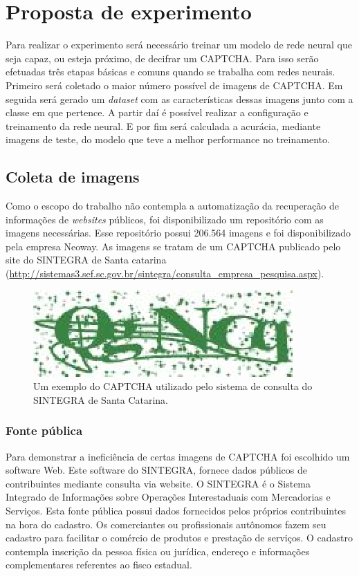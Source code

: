 \chapter{Proposta de experimento} \label{proposta}

Para realizar o experimento será necessário treinar um modelo de rede
neural que seja capaz, ou esteja próximo, de decifrar um CAPTCHA. Para
isso serão efetuadas três etapas básicas e comuns quando se trabalha
com redes neurais. Primeiro será coletado o maior número possível de
imagens de CAPTCHA. Em seguida será gerado um \textit{dataset} com as
características dessas imagens junto com a classe em que pertence. A
partir daí é possível realizar a configuração e treinamento da rede
neural. E por fim será calculada a acurácia, mediante imagens de
teste, do modelo que teve a melhor performance no treinamento.

\section{Coleta de imagens}

Como o escopo do trabalho não contempla a automatização da recuperação
de informações de \textit{websites} públicos, foi disponibilizado um
repositório com as imagens necessárias. Esse repositório possui
206.564 imagens e foi disponibilizado pela empresa Neoway. As imagens
se tratam de um CAPTCHA publicado pelo site do SINTEGRA de Santa
catarina
(\url{http://sistemas3.sef.sc.gov.br/sintegra/consulta_empresa_pesquisa.aspx}).

\begin{figure}[H]
\centering
\includegraphics[scale=1]{imagens/exemplo_captcha}
\caption{Um exemplo do CAPTCHA utilizado pelo sistema de consulta do
  SINTEGRA de Santa Catarina.}
\label{fig:exemplo_captcha}
\end{figure}


\subsection{Fonte pública}

Para demonstrar a ineficiência de certas imagens de CAPTCHA foi
escolhido um software Web. Este software do SINTEGRA, fornece dados
públicos de contribuintes mediante consulta via website. O SINTEGRA é
o Sistema Integrado de Informações sobre Operações Interestaduais com
Mercadorias e Serviços. Esta fonte pública possui dados fornecidos
pelos próprios contribuintes na hora do cadastro. Os comerciantes ou
profissionais autônomos fazem seu cadastro para facilitar o comércio
de produtos e prestação de serviços. O cadastro contempla inscrição da
pessoa física ou jurídica, endereço e informações complementares
referentes ao fisco estadual.

